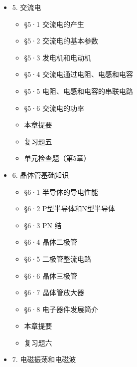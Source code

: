 \begin{itemize}
  \begin{itemize}
  \tightlist
  \item
    §4·1 电磁感应现象
  \item
    §4·2 感生电流的方向
  \item
    §4·3 法拉第电磁感应定律
  \item
    §4·4 自感现象
  \item
    §4·5 变压器
  \item
    §4·6 涡电流
  \item
    本章提要
  \item
    复习题四
  \item
    单元检查题（第4章）
  \end{itemize}
\item
  5. 交流电

  \begin{itemize}
  \tightlist
  \item
    §5·1 交流电的产生
  \item
    §5·2 交流电的基本参数
  \item
    §5·3 发电机和电动机
  \item
    §5·4 交流电通过电阻、电感和电容
  \item
    §5·5 电阻、电感和电容的串联电路
  \item
    §5·6 交流电的功率
  \item
    本章提要
  \item
    复习题五
  \item
    单元检查题（第5章）
  \end{itemize}
\item
  6. 晶体管基础知识

  \begin{itemize}
  \tightlist
  \item
    §6·1 半导体的导电性能
  \item
    §6·2 P型半导体和N型半导体
  \item
    §6·3 PN 结
  \item
    §6·4 晶体二极管
  \item
    §6·5 二极管整流电路
  \item
    §6·6 晶体三极管
  \item
    §6·7 晶体管放大器
  \item
    §6·8 电子器件发展简介
  \item
    本章提要
  \item
    复习题六
  \end{itemize}
\item
  7. 电磁振荡和电磁波


\end{itemize}
